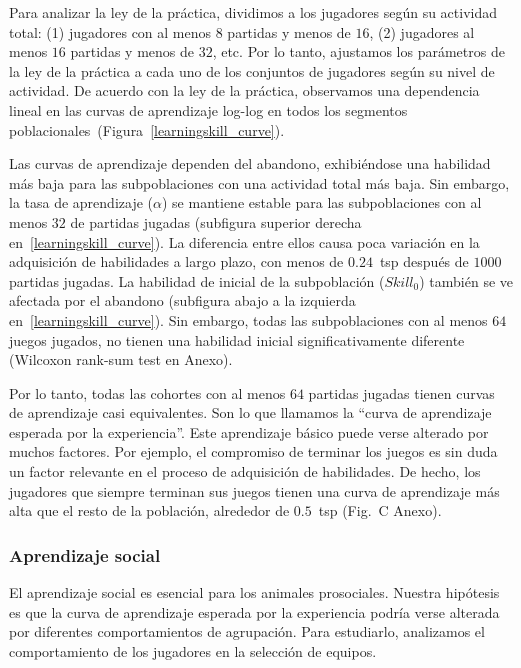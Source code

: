 \documentclass[a4paper,10pt]{book}
\theoremstyle{definition}
\begin{document}

Para analizar la ley de la práctica, dividimos a los jugadores seg\'un su actividad total: (1) jugadores con al menos $8$ partidas y menos de $16$, (2) jugadores al menos $16$ partidas y menos de $32$, etc.
%
Por lo tanto, ajustamos los parámetros de la ley de la práctica a cada uno de los conjuntos de jugadores seg\'un su nivel de actividad.
%
De acuerdo con la ley de la práctica, observamos una dependencia lineal en las curvas de aprendizaje log-log en todos los segmentos poblacionales~(Figura~\ref{learningskill_curve}).


Las curvas de aprendizaje dependen del abandono, exhibiéndose una habilidad más baja para las subpoblaciones con una actividad total más baja.
%
Sin embargo, la tasa de aprendizaje ($\alpha$) se mantiene estable para las subpoblaciones con al menos $32$ de partidas jugadas (subfigura superior derecha en~\ref{learningskill_curve}).
%
La diferencia entre ellos causa poca variación en la adquisición de habilidades a largo plazo, con menos de $0.24$~tsp después de $1000$ partidas jugadas.
%
La habilidad de inicial de la subpoblación ($Skill_0$) también se ve afectada por el abandono (subfigura abajo a la izquierda en~\ref{learningskill_curve}).
%
Sin embargo, todas las subpoblaciones con al menos $64$ juegos jugados, no tienen una habilidad inicial significativamente diferente (Wilcoxon rank-sum test en Anexo). 


Por lo tanto, todas las cohortes con al menos $64$ partidas jugadas tienen curvas de aprendizaje casi equivalentes.
%
Son lo que llamamos la ``curva de aprendizaje esperada por la experiencia''.
%
Este aprendizaje básico puede verse alterado por muchos factores.
%
Por ejemplo, el compromiso de terminar los juegos es sin duda un factor relevante en el proceso de adquisición de habilidades.
%
De hecho, los jugadores que siempre terminan sus juegos tienen una curva de aprendizaje más alta que el resto de la población, alrededor de $0.5$~tsp (Fig.~C Anexo).

\subsubsection{Aprendizaje social}

El aprendizaje social es esencial para los animales prosociales.
%
Nuestra hipótesis es que la curva de aprendizaje esperada por la experiencia podría verse alterada por diferentes comportamientos de agrupación.
%
Para estudiarlo, analizamos el comportamiento de los jugadores en la selección de equipos.
\end{document}
